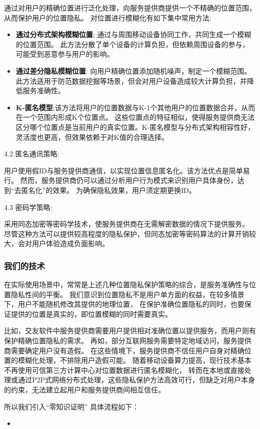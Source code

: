 \documentclass[zihao=-4]{ctexart}
\begin{document}
通过对用户的精确位置进行泛化处理，向服务提供商提供一个不精确的位置范围，从而保护用户的位置隐私。
对位置进行模糊化有如下集中常用方法:
\begin{itemize}
  \item \textbf{通过分布式架构模糊位置}: 通过与周围移动设备协同工作，共同生成一个模糊的位置范围。
  此方法分散了单个设备的计算负担，但依赖周围设备的参与，可能受到恶意参与用户的影响。
  \item \textbf{通过差分隐私模糊位置}: 向用户精确位置添加随机噪声，制定一个模糊范围。此方法适用于防范数据挖掘等场景，但会对用户设备造成较大计算负担，并降低服务准确性。
  \item \textbf{K-匿名模型}:该方法将用户的位置数据与K-1个其他用户的位置数据合并，从而在一个范围内形成K个位置点。
  这些位置点的特征相似，使得服务提供商无法区分哪个位置点是当前用户的真实位置。K-匿名模型与分布式架构相容性好，灵活度也更高，但效果依赖于对K值的合理选择。
\end{itemize}
\par
4.2 匿名通讯策略: \par
用户使用假ID与服务提供商通信，以实现位置信息匿名化。该方法优点是简单易行。
然而，服务提供商仍可以通过分析用户行为模式来识别用户具体身份，达到“去匿名化”的效果。
为确保隐私效果，用户须定期更换ID。
\par
4.3 密码学策略: \par
采用同态加密等密码学技术，使服务提供商在无需解密数据的情况下提供服务。
尽管这种方法可以提供较高程度的隐私保护，但同态加密等密码算法的计算开销较大，会对用户体验造成负面影响。

\subsubsection{我们的技术}
在实际使用场景中，常常是上述几种位置隐私保护策略的综合，是服务准确性与位置隐私性间的平衡。
我们意识到位置隐私不是用户单方面的权益，在较多情景下，用户不能随机修改其提供的地理位置，
在保护准确位置隐私的同时，也要保证提供的位置是真实的，即位置模糊的同时需要真实。
\par
比如，交友软件中服务提供商需要用户提供相对准确位置以提供服务，而用户则有保护精确位置隐私的需求。
再如，部分互联网服务需要特定地域访问，服务提供商需要确定用户没有造假。
在这些情境下，服务提供商不信任用户自身对精确位置的模糊化处理，不排除用户造假可能。
随着移动设备算力提高，现行技术基本不再使用可信第三方计算中心对位置数据进行匿名模糊化，
转而在本地或直接处理或通过P2P式网络分布式处理，这些隐私保护方法高效可行，但缺乏对用户本身的约束，无法建立起用户和服务提供商间相互信任。
\par
所以我们引入“零知识证明”
具体流程如下：
\begin{itemize}
  \item 
\end{itemize}
\fi 
\end{document}
